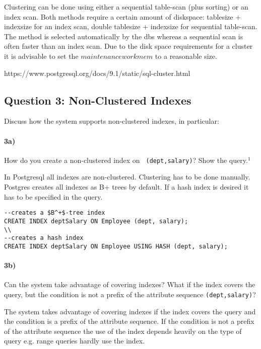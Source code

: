 \documentclass[11pt]{scrartcl}
\begin{document}
Clustering can be done using either a sequential table-scan (plus sorting) or an index scan. Both methods require a certain amount of diskspace: tablesize + indexsize for an index scan, double tablesize + indexsize for sequential table-scan.
The method is selected automatically by the dbs whereas a sequential scan is often faster than an index scan. Due to the disk space requirements for a cluster it is advisable to set the $maintenance work mem$ to a reasonable size.

https://www.postgresql.org/docs/9.1/static/sql-cluster.html

\subsection*{Question 3: Non-Clustered Indexes}

Discuss how the system supports non-clustered indexes, in
particular:

\paragraph{3a)} How do you create a non-clustered index on {\tt
  (dept,salary)}? Show the query.$^1$

In Postgresql all indexes are non-clustered. Clustering has to be done manually.
Postgres creates all indexes as B+ trees by default. If a hash index is desired it has to be specified in the query.

{\small
\begin{verbatim}
--creates a $B^+$-tree index
CREATE INDEX deptSalary ON Employee (dept, salary);
\\
--creates a hash index
CREATE INDEX deptSalary ON Employee USING HASH (dept, salary);
\end{verbatim}
}

\paragraph{3b)} Can the system take advantage of covering indexes? What if the
index covers the query, but the condition is not a prefix of the
attribute sequence {\tt (dept,salary)}?

The system takes advantage of covering indexes if the index covers the query and the condition is a prefix of the attribute sequence. If the condition is not a prefix of the attribute sequence the use of the index depends heavily on the type of query e.g. range queries hardly use the index.
\end{document}
